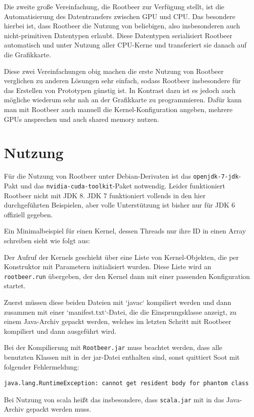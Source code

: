 \documentclass[german,bibnum,beleg,zihtitle,german,hyperref,utf8]{zihpub}
\begin{document}
Die zweite große Vereinfachung, die Rootbeer zur Verfügung stellt, ist die Automatisierung des Datentransfers zwischen GPU und CPU. Das besondere hierbei ist, dass Rootbeer die Nutzung von beliebigen, also insbesonderen auch nicht-primitiven Datentypen erlaubt. Diese Datentypen serialisiert Rootbeer automatisch und unter Nutzung aller CPU-Kerne und transferiert sie danach auf die Grafikkarte.

Diese zwei Vereinfachungen obig machen die erste Nutzung von Rootbeer verglichen zu anderen Lösungen sehr einfach, sodass Rootbeer insbesondere für das Erstellen von Prototypen günstig ist.
In Kontrast dazu ist es jedoch auch mögliche wiederum sehr nah an der Grafikkarte zu programmieren. Dafür kann man mit Rootbeer auch manuell die Kernel-Konfiguration angeben, mehrere GPUs ansprechen und auch shared memory nutzen.

\section{Nutzung}

Für die Nutzung von Rootbeer unter Debian-Derivaten ist das \texttt{openjdk-7-jdk}-Pakt und das \texttt{nvidia-cuda-toolkit}-Paket notwendig. Leider funktioniert Rootbeer nicht mit JDK 8. JDK 7 funktioniert vollends in den hier durchgeführten Beispielen, aber volle Unterstützung ist bisher nur für JDK 6 offiziell gegeben\cite{rootbeerjdk6}.

Ein Minimalbeispiel für einen Kernel, dessen Threads nur ihre ID in einen Array schreiben sieht wie folgt aus:

Der Aufruf der Kernels geschieht über eine Liste von Kernel-Objekten, die per Konstruktor mit Parametern initialisiert wurden. Diese Liste wird an \texttt{rootbeer.run} übergeben, der den Kernel dann mit einer passenden Konfiguration startet.

Zuerst müssen diese beiden Dateien mit `javac` kompiliert werden und dann zusammen mit einer `manifest.txt`-Datei, die die Einsprungsklasse anzeigt, zu einem Java-Archiv gepackt werden, welches im letzten Schritt mit Rootbeer kompiliert und dann ausgeführt wird.

Bei der Kompilierung mit \texttt{Rootbeer.jar} muss beachtet werden, dass alle benutzten Klassen mit in der jar-Datei enthalten sind, sonst quittiert Soot mit folgender Fehlermeldung:
\begin{lstlisting}
java.lang.RuntimeException: cannot get resident body for phantom class
\end{lstlisting}\vspace{-1.5\baselineskip}
Bei Nutzung von scala heißt das insbesondere, dass \texttt{scala.jar} mit in das Java-Archiv gepackt werden muss.
\end{document}
